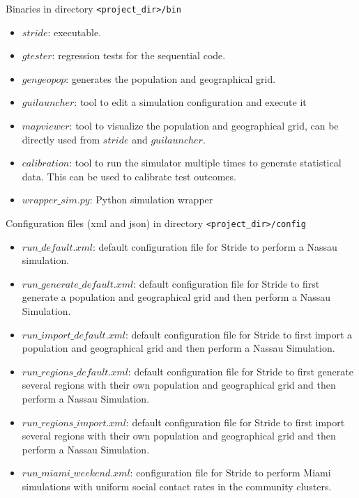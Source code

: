 \begin{compactitem}
    \item Binaries
    		in directory \texttt{<project\_dir>/bin}
      	\begin{itemize}
        		\item $stride$: executable.
        		\item $gtester$: regression tests for the sequential code.
                \item $gengeopop$: generates the population and geographical grid.
                \item $guilauncher$: tool to edit a simulation configuration and execute it
                \item $mapviewer$: tool to visualize the population and geographical grid, can be directly used from $stride$ and $guilauncher$.
                \item $calibration$: tool to run the simulator multiple times to generate statistical data. This can be used to calibrate test outcomes.
        		\item $wrapper\_sim.py$: Python simulation wrapper
        \end{itemize}
    \item Configuration files (xml and json)
      	in directory \texttt{<project\_dir>/config}
      	\begin{itemize}
		\item $run\_default.xml$: default configuration file for Stride to perform a Nassau simulation.
        \item $run\_generate\_default.xml$: default configuration file for Stride to first generate a population and geographical grid and then perform a Nassau Simulation.
        \item $run\_import\_default.xml$: default configuration file for Stride to first import a population and geographical grid and then perform a Nassau Simulation.
        \item $run\_regions\_default.xml$: default configuration file for Stride to first generate several regions with their own population and geographical grid and then perform a Nassau Simulation.
        \item $run\_regions\_import.xml$: default configuration file for Stride to first import several regions with their own population and geographical grid and then perform a Nassau Simulation.
        \item $run\_miami\_weekend.xml$: configuration file for Stride to perform Miami simulations with uniform social contact rates in the community clusters.

\end{itemize}
\end{compactitem}
